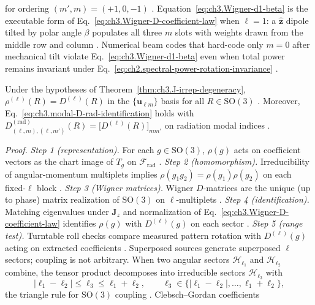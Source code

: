 for ordering \((m',m)=(+1,0,-1)\) \cite{jackson1999}. Equation~\eqref{eq:ch3.Wigner-d1-beta} is the
executable form of Eq.~\eqref{eq:ch3.Wigner-D-coefficient-law} when \(\ell=1\): a \(\hat{\mathbf{z}}\) dipole
tilted by polar angle \(\beta\) populates all three \(m\) slots with weights drawn from the middle row and column
\cite{jackson1999}. Numerical beam codes that hard-code only \(m=0\) after mechanical tilt violate
Eq.~\eqref{eq:ch3.Wigner-d1-beta} even when total power remains invariant under
Eq.~\eqref{eq:ch2.spectral-power-rotation-invariance} \cite{harrington2001}.
\begin{theorem}
\label{thm:ch3.Wigner-D-realizes-rho}
Under the hypotheses of Theorem~\ref{thm:ch3.J-irrep-degeneracy},
\(\rho^{(\ell)}(R)=D^{(\ell)}(R)\) in the \(\{\mathbf{u}_{\ell m}\}\) basis for all
\(R\in\mathrm{SO}(3)\) \cite{jackson1999}. Moreover,
Eq.~\eqref{eq:ch3.modal-D-rad-identification} holds with
\(D^{(\mathrm{rad})}_{(\ell,m),(\ell,m')}(R)=\big[D^{(\ell)}(R)\big]_{mm'}\) on radiation modal indices
\cite{stratton1941}.
\end{theorem}
\noindent\textit{Proof.}
\emph{Step 1 (representation).} For each \(g\in\mathrm{SO}(3)\), \(\rho(g)\) acts on coefficient vectors as the chart image of \(T_g\) on \(\mathcal{F}_{\mathrm{rad}}\) .
\emph{Step 2 (homomorphism).} Irreducibility of angular-momentum multiplets implies \(\rho(g_1g_2)=\rho(g_1)\rho(g_2)\) on each fixed-\(\ell\) block .
\emph{Step 3 (Wigner matrices).} Wigner \(D\)-matrices are the unique (up to phase) matrix realization of \(\mathrm{SO}(3)\) on \(\ell\)-multiplets .
\emph{Step 4 (identification).} Matching eigenvalues under \(\mathbf{J}_{z}\) and normalization of Eq.~\eqref{eq:ch3.Wigner-D-coefficient-law} identifies \(\rho(g)\) with \(D^{(\ell)}(g)\) on each sector .
\emph{Step 5 (range test).} Turntable roll checks compare measured pattern rotation with \(D^{(\ell)}(g)\) acting on extracted coefficients .
Superposed sources generate superposed \(\ell\) sectors; coupling is not arbitrary. When two angular sectors
\(\mathcal{H}_{\ell_1}\) and \(\mathcal{H}_{\ell_2}\) combine, the tensor product decomposes into irreducible
sectors \(\mathcal{H}_{\ell_3}\) with
\begin{equation}
\label{eq:ch3.CG-triangle-rule}
|\ell_1-\ell_2|
\le
\ell_3
\le
\ell_1+\ell_2,
\qquad
\ell_3\in\{|\ell_1-\ell_2|,\ldots,\ell_1+\ell_2\},
\end{equation}
the triangle rule for \(\mathrm{SO}(3)\) coupling . Clebsch--Gordan coefficients
